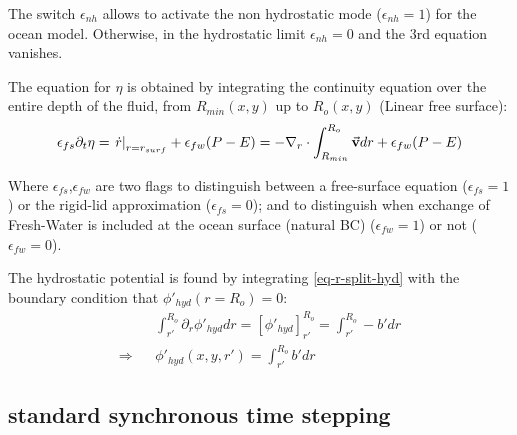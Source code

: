 The switch $\epsilon_{nh}$ allows to activate the non hydrostatic
mode ($\epsilon_{nh}=1$) for the ocean model. Otherwise, 
in the hydrostatic limit $\epsilon_{nh} = 0$ and the 3rd equation vanishes.

The equation for $\eta$ is obtained by integrating the 
continuity equation over the entire depth of the fluid, 
from $R_{min}(x,y)$ up to $R_o(x,y)$ 
(Linear free surface):
\begin{displaymath}
\epsilon_{fs} \partial_t \eta =
\left. \dot{r} \right|_{r=r_{surf}} + \epsilon_{fw} (P-E) =
- {\bf \nabla}_r \cdot \int_{R_{min}}^{R_o} \vec{\bf v} dr
+ \epsilon_{fw} (P-E)
\end{displaymath}

Where $\epsilon_{fs}$,$\epsilon_{fw}$ are two flags to 
distinguish between a free-surface equation ($\epsilon_{fs}=1$) 
or the rigid-lid approximation ($\epsilon_{fs}=0$);  
and to distinguish when exchange of Fresh-Water is included 
at the ocean surface (natural BC) ($\epsilon_{fw} = 1$) 
or not ($\epsilon_{fw} = 0$).

The hydrostatic potential is found by
integrating \ref{eq-r-split-hyd} with the boundary condition that
$\phi'_{hyd}(r=R_o) = 0$:
\begin{eqnarray*}
& &
\int_{r'}^{R_o} \partial_r \phi'_{hyd} dr =
\left[ \phi'_{hyd} \right]_{r'}^{R_o} =
\int_{r'}^{R_o} - b' dr
\\
\Rightarrow & &
\phi'_{hyd}(x,y,r') = \int_{r'}^{R_o} b' dr
\end{eqnarray*}

\subsection{standard synchronous time stepping}

